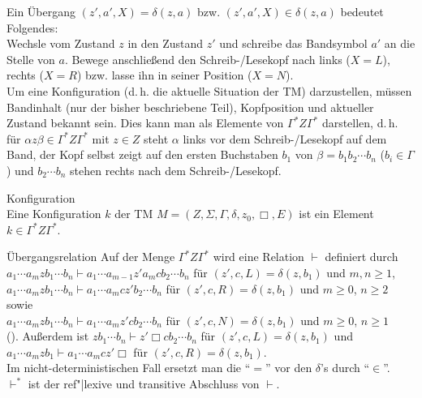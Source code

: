 \linie

\begin{Bem}
    Ein Übergang $(z', a', X) = \delta(z, a)$ bzw.
    $(z', a', X) \in \delta(z, a)$ bedeutet Folgendes:\\
    Wechsle vom Zustand $z$ in den Zustand $z'$ und schreibe das Bandsymbol
    $a'$ an die Stelle von $a$.
    Bewege anschließend den Schreib-/Lesekopf nach links ($X = L$),
    rechts ($X = R$) bzw. lasse ihn in seiner Position ($X = N$).\\
    Um eine Konfiguration (d.\,h. die aktuelle Situation der TM) darzustellen,
    müssen Bandinhalt (nur der bisher beschriebene Teil),
    Kopfposition und aktueller Zustand bekannt sein.
    Dies kann man als Elemente von $\Gamma^\ast Z \Gamma^\ast$ darstellen,
    d.\,h. für $\alpha z \beta \in \Gamma^\ast Z \Gamma^\ast$ mit $z \in Z$
    steht $\alpha$ links vor dem Schreib-/Lesekopf auf dem Band,
    der Kopf selbst zeigt auf den ersten Buchstaben $b_1$ von
    $\beta = b_1 b_2 \dotsb b_n$ ($b_i \in \Gamma$) und
    $b_2 \dotsb b_n$ stehen rechts nach dem Schreib-/Lesekopf.
\end{Bem}

\begin{Def}{Konfiguration}\\
    Eine Konfiguration $k$ der TM
    $M = (Z, \Sigma, \Gamma, \delta, z_0, \Box, E)$
    ist ein Element $k \in \Gamma^\ast Z \Gamma^\ast$.
\end{Def}

\begin{Def}{Übergangsrelation}
    Auf der Menge $\Gamma^\ast Z \Gamma^\ast$ wird eine
    Relation $\vdash$ definiert durch\\
    $a_1 \dotsb a_m z b_1 \dotsb b_n \vdash
    a_1 \dotsb a_{m-1} z' a_m c b_2 \dotsb b_n$ für
    $(z', c, L) = \delta(z, b_1)$ und $m, n \ge 1$,\\
    $a_1 \dotsb a_m z b_1 \dotsb b_n \vdash
    a_1 \dotsb a_m c z' b_2 \dotsb b_n$ für
    $(z', c, R) = \delta(z, b_1)$ und $m \ge 0$, $n \ge 2$ sowie\\
    $a_1 \dotsb a_m z b_1 \dotsb b_n \vdash
    a_1 \dotsb a_m z' c b_2 \dotsb b_n$ für
    $(z', c, N) = \delta(z, b_1)$ und $m \ge 0$, $n \ge 1$\\
    ().
    Außerdem ist
    $z b_1 \dotsb b_n \vdash
    z' \Box c b_2 \dotsb b_n$ für
    $(z', c, L) = \delta(z, b_1)$ und\\
    $a_1 \dotsb a_m z b_1 \vdash
    a_1 \dotsb a_m c z' \Box$ für
    $(z', c, R) = \delta(z, b_1)$.\\
    Im nicht-deterministischen Fall ersetzt man die "`$=$"'
    vor den $\delta$'s durch "`$\in$"'.\\
    $\vdash^\ast$ ist der ref"|lexive und transitive Abschluss von $\vdash$.
\end{Def}


